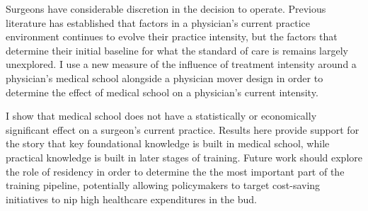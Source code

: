  
Surgeons have considerable discretion in the decision to operate. Previous literature has established that factors in a physician's current practice environment continues to evolve their practice intensity, but the factors that determine their initial baseline for what the standard of care is remains largely unexplored. I use a new measure of the influence of treatment intensity around a physician's medical school alongside a physician mover design in order to determine the effect of medical school on a physician's current intensity.

I show that medical school does not have a statistically or economically significant effect on a surgeon's current practice. Results here provide support for the story that key foundational knowledge is built in medical school, while practical knowledge is built in later stages of training. Future work should explore the role of residency in order to determine the the most important part of the training pipeline, potentially allowing policymakers to target cost-saving initiatives to nip high healthcare expenditures in the bud. 